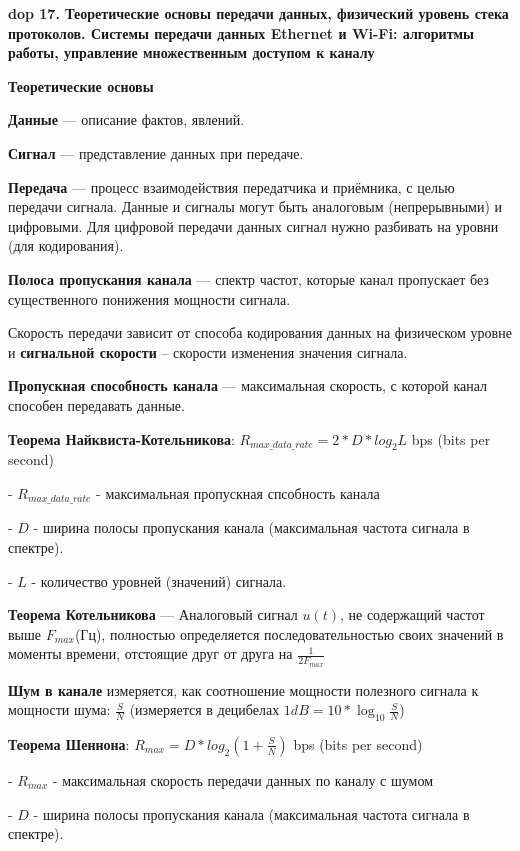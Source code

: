 \textbf{\LARGE dop 17. Теоретические основы передачи данных, физический уровень стека протоколов. Системы передачи данных Ethernet и Wi-Fi: алгоритмы работы, управление множественным доступом к каналу}

\textbf{Теоретические основы}


\textbf{Данные} --- описание фактов, явлений.

\textbf{Сигнал} --- представление данных при передаче.

\textbf{Передача} --- процесс взаимодействия передатчика и приёмника, с целью передачи сигнала.
Данные и сигналы могут быть аналоговым (непрерывными) и цифровыми.
Для цифровой передачи данных сигнал нужно разбивать на уровни (для кодирования).

\textbf{Полоса пропускания канала} --- спектр частот, которые канал пропускает без существенного понижения мощности сигнала.

Скорость передачи зависит от способа кодирования данных на физическом уровне и \textbf{сигнальной скорости} -- скорости изменения значения сигнала.

\textbf{Пропускная способность канала} --- максимальная скорость, с которой канал способен передавать данные.

\bigbreak
\textbf{Теорема Найквиста-Котельникова}: $R_{max\_data\_rate} = 2*D*log_2{L}$ bps (bits per second)

- $R_{max\_data\_rate}$ - максимальная пропускная спсобность канала

- $D$ - ширина полосы пропускания канала (максимальная частота сигнала в спектре).

- $L$ - количество уровней (значений) сигнала.

\bigbreak
\textbf{Теорема Котельникова} --- Аналоговый сигнал $u(t)$, не содержащий частот выше $F_{max}$(Гц), полностью определяется последовательностью своих значений в моменты времени, отстоящие друг от друга на $\frac{1}{2F_{max}}$

\bigbreak
\textbf{Шум в канале} измеряется, как соотношение мощности полезного сигнала к мощности шума: $\frac{S}{N}$ (измеряется в децибелах $1dB = 10*\log_{10}{\frac{S}{N}}$)

\bigbreak
\textbf{Теорема Шеннона}: $R_{max} = D*log_2{(1+\frac{S}{N})}$ bps (bits per second)

- $R_{max}$ - максимальная скорость передачи данных по каналу с шумом

- $D$ - ширина полосы пропускания канала (максимальная частота сигнала в спектре).

